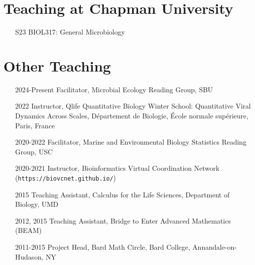 \documentclass[]{res}
\begin{document}
\begin{resume}
\section{ Teaching at Chapman University} 
\begin{itemize} \itemsep -2pt
\item[S23] BIOL317: General Microbiology
\end{itemize}

\section{Other Teaching}
\begin{itemize} \itemsep -2pt
\item[2024-Present] { Facilitator,} {Microbial Ecology Reading Group}, SBU
\item[2022] { Instructor,} Qlife Quantitative Biology Winter School: Quantitative Viral Dynamics Across Scales, D\'{e}partement de Biologie, \'{E}cole normale sup\'{e}rieure, Paris, France
\item[2020-2022] { Facilitator,} {Marine and Environmental Biology Statistics Reading Group}, USC
\item[2020-2021] { Instructor,} Bioinformatics Virtual Coordination Network (\verb|https://biovcnet.github.io/|)
\item[2015] {Teaching Assistant, Calculus for the Life Sciences,} Department of Biology, UMD
\item[2012, 2015] {Teaching Assistant, Bridge to Enter Advanced Mathematics (BEAM)}
\item[2011-2015] { Project Head, Bard Math Circle}, Bard College, Annandale-on-Hudason, NY
\end{itemize}



\end{resume}
\end{document}

